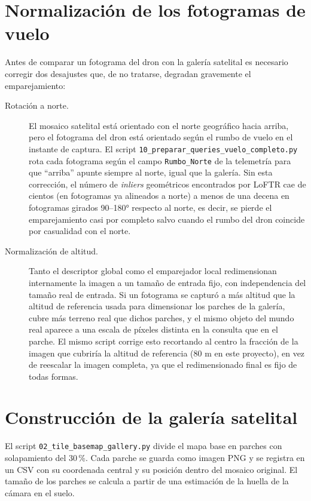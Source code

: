 \section{Normalización de los fotogramas de vuelo}
\label{sec:normalizacion-frames}

Antes de comparar un fotograma del dron con la galería satelital es necesario corregir dos desajustes que, de no tratarse, degradan gravemente el emparejamiento:

\begin{description}
\item[Rotación a norte.] El mosaico satelital está orientado con el norte geográfico hacia arriba, pero el fotograma del dron está orientado según el rumbo de vuelo en el instante de captura. El script \texttt{10\_preparar\_queries\_vuelo\_completo.py} rota cada fotograma según el campo \texttt{Rumbo\_Norte} de la telemetría para que \enquote{arriba} apunte siempre al norte, igual que la galería. Sin esta corrección, el número de \textit{inliers} geométricos encontrados por LoFTR cae de cientos (en fotogramas ya alineados a norte) a menos de una decena en fotogramas girados 90--180° respecto al norte, es decir, se pierde el emparejamiento casi por completo salvo cuando el rumbo del dron coincide por casualidad con el norte.
\item[Normalización de altitud.] Tanto el descriptor global como el emparejador local redimensionan internamente la imagen a un tamaño de entrada fijo, con independencia del tamaño real de entrada. Si un fotograma se capturó a más altitud que la altitud de referencia usada para dimensionar los parches de la galería, cubre más terreno real que dichos parches, y el mismo objeto del mundo real aparece a una escala de píxeles distinta en la consulta que en el parche. El mismo script corrige esto recortando al centro la fracción de la imagen que cubriría la altitud de referencia (80 m en este proyecto), en vez de reescalar la imagen completa, ya que el redimensionado final es fijo de todas formas.
\end{description}

\section{Construcción de la galería satelital}
\label{sec:construccion-galeria}

El script \texttt{02\_tile\_basemap\_gallery.py} divide el mapa base en parches con solapamiento del 30\,\%. Cada parche se guarda como imagen PNG y se registra en un CSV con su coordenada central y su posición dentro del mosaico original. El tamaño de los parches se calcula a partir de una estimación de la huella de la cámara en el suelo.


